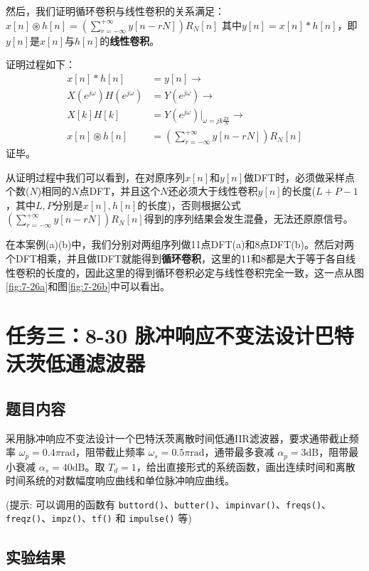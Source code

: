 \documentclass[UTF8,12pt,a4paper]{ctexart}
\begin{document}
然后，我们证明循环卷积与线性卷积的关系满足：$x[n]\circledast h[n] =  (\sum_{r=-\infty}^{+\infty}y[n-rN])R_N[n]$
其中$y[n] = x[n] * h[n]$，即$y[n]$是$x[n]$与$h[n]$的\textbf{线性卷积}。

证明过程如下：
\begin{align*}
     x[n] * h[n] & = y[n] \rightarrow \\
     X(e^{j\omega})H(e^{j\omega}) & = Y(e^{j\omega}) \rightarrow \\
     X[k]H[k] & = Y(e^{j\omega})\big|_{\omega = jk\frac{2\pi}{N}} \rightarrow \\
     x[n] \circledast h[n] & = (\sum_{r=-\infty}^{+\infty}y[n-rN])R_N[n]
\end{align*}
证毕。

从证明过程中我们可以看到，在对原序列$x[n]$和$y[n]$做DFT时，必须做采样点个数($N$)相同的$N$点DFT，并且这个$N$还必须大于线性卷积$y[n]$的长度($L+P-1$，其中$L, P$分别是$x[n], h[n]$的长度)，否则根据公式$(\sum_{r=-\infty}^{+\infty}y[n-rN])R_N[n]$得到的序列结果会发生混叠，无法还原原信号。

在本案例(a)(b)中，我们分别对两组序列做11点DFT(a)和8点DFT(b)。然后对两个DFT相乘，并且做IDFT就能得到\textbf{循环卷积}，这里的11和8都是大于等于各自线性卷积的长度的，因此这里的得到循环卷积必定与线性卷积完全一致，这一点从图\ref{fig:7-26a}和图\ref{fig:7-26b}中可以看出。
\newpage
\section{任务三：8-30 脉冲响应不变法设计巴特沃茨低通滤波器}

\subsection{题目内容}
采用脉冲响应不变法设计一个巴特沃茨离散时间低通IIR滤波器，要求通带截止频率 $\omega_p = 0.4\pi \text{rad}$，阻带截止频率 $\omega_s = 0.5\pi \text{rad}$，通带最多衰减 $\alpha_p = 3\text{dB}$，阻带最小衰减 $\alpha_s = 40\text{dB}$。取 $T_d = 1$，给出直接形式的系统函数，画出连续时间和离散时间系统的对数幅度响应曲线和单位脉冲响应曲线。

(提示: 可以调用的函数有 \texttt{buttord()}、\texttt{butter()}、\texttt{impinvar()}、\texttt{freqs()}、\texttt{freqz()}、\texttt{impz()}、\texttt{tf()} 和 \texttt{impulse()} 等)

\subsection{实验结果}
\end{document}
